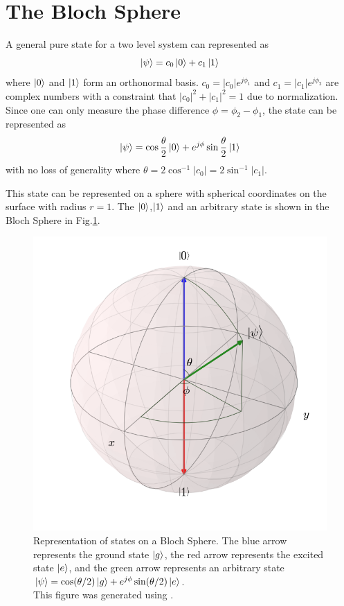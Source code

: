 \section{The Bloch Sphere}

A general pure state for a two level system can represented as
\begin{equation}
\ket{\psi} = c_0\ket{0}+c_1\ket{1}
\end{equation}
where $\ket{0}$ and $\ket{1}$ form an orthonormal basis. $c_0=|c_0|e^{j\phi_1}$ and $c_1=|c_1|e^{j\phi_2}$ are complex numbers with a constraint that $|c_0|^2+|c_1|^2 = 1$ due to normalization. Since one can only measure the phase difference $\phi = \phi_2-\phi_1$, the state can be represented as
\begin{equation}
\ket{\psi} = \cos\frac{\theta}{2}\ket{0}+e^{j\phi}\sin\frac{\theta}{2}\ket{1}
\end{equation}
with no loss of generality where $\theta= 2\cos^{-1}|c_0|=2\sin^{-1}|c_1|$.

This state can be represented on a sphere with spherical coordinates on the surface with radius $r = 1$. The $\ket{0}$,$\ket{1}$ and an arbitrary state is shown in the Bloch Sphere in Fig.\ref{fig:bloch rep}.

\begin{figure}
\centering
\includegraphics[width=\linewidth]{Figures/bloch_rep.png}
\decoRule
\caption[Bloch Sphere Representation]{Representation of states on a Bloch Sphere. The blue arrow represents the ground state $\ket{g}$, the red arrow represents the excited state $\ket{e}$, and the green arrow represents an arbitrary state $\ket{\psi} = \cos(\theta/2)\ket{g}+e^{j\phi}\sin(\theta/2)\ket{e}$.\\This figure was generated using \cite{Johansson2012}.}
\label{fig:bloch rep}
\end{figure}

